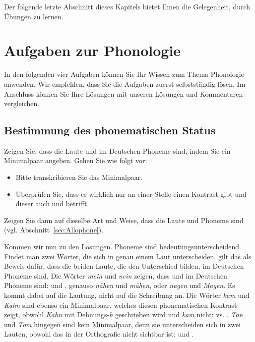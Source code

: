 Der folgende letzte Abschnitt dieses Kapitels bietet Ihnen die Gelegenheit, durch Übungen zu lernen. 

\section{Aufgaben zur Phonologie}
In den folgenden vier Aufgaben können Sie Ihr Wissen zum Thema Phonologie anwenden. Wir empfehlen, dass Sie die Aufgaben zuerst selbstständig lösen. Im Anschluss können Sie Ihre Lösungen mit unseren Lösungen und Kommentaren vergleichen.

\subsection{Bestimmung des phonematischen Status}

Zeigen Sie, dass die Laute \textipa{[m]} und \textipa{[n]} im Deutschen Phoneme sind, indem Sie ein Minimalpaar angeben. Gehen Sie wie folgt vor:
\begin{itemize}
\item Bitte transkribieren Sie das Minimalpaar.
\item Überprüfen Sie, dass es wirklich nur an einer Stelle einen Kontrast gibt und dieser auch \textipa{[m]} und \textipa{[n]} betrifft. 
\end{itemize}

Zeigen Sie dann auf dieselbe Art und Weise, dass die Laute \textipa{[o]} und \textipa{[y]} Phoneme sind (vgl. Abschnitt~\ref{sec:Allophone}).

Kommen wir nun zu den Lösungen. Phoneme sind bedeutungsunterscheidend. Findet man zwei Wörter, die sich in genau einem Laut unterscheiden, gilt das als Beweis dafür, dass die beiden Laute, die den Unterschied bilden, im Deutschen Phoneme sind. Die Wörter \textit{mein} und \textit{nein} zeigen, dass \textipa{[m]} und \textipa{[n]} im Deutschen Phoneme sind: \textipa{[m\t*{aI}n]} und \textipa{[n\t*{aI}n]}, genauso \textit{nähen} und \textit{mähen}, oder \textit{nagen} und \textit{Magen}. Es kommt dabei auf die Lautung, nicht auf die Schreibung an. Die Wörter \textit{kam} und \textit{Kahn} sind ebenso ein Minimalpaar, welches diesen phonematischen Kontrast zeigt, obwohl \textit{Kahn} mit Dehnungs-\textit{h} geschrieben wird und \textit{kam} nicht: \textipa{[ka:m]} vs. \textipa{[ka:n]}. \textit{Ton} und \textit{Tom} hingegen sind kein Minimalpaar, denn sie unterscheiden sich in zwei Lauten, obwohl das in der Orthografie nicht sichtbar ist: \textipa{[to:n]} und \textipa{[tOm]}.

